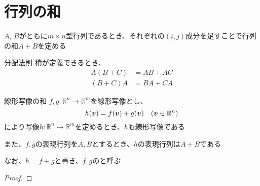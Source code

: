 \documentclass[../../../topic_linear-algebra]{subfiles}
\begin{document}
\sectionline
\section{行列の和}

\begin{mindflow}
\end{mindflow}

$A, \, B$がともに$m \times n$型行列であるとき、それぞれの$(i, j)$成分を足すことで行列の和$A + B$を定める

\begin{theorem*}{分配法則}
  積が定義できるとき、
  \begin{align*}
    A(B + C) & = AB + AC \\
    (B + C)A & = BA + CA
  \end{align*}
\end{theorem*}

\sectionline

\begin{theorem*}{線形写像の和}
  $f,g\colon \mathbb{R}^n \to \mathbb{R}^m$を線形写像とし、
  \begin{equation*}
    h(\vb*{v}) = f(\vb*{v}) + g(\vb*{v}) \quad (\vb*{v} \in \mathbb{R}^n)
  \end{equation*}
  により写像$h\colon \mathbb{R}^n \to \mathbb{R}^m$を定めるとき、$h$も線形写像である

  また、$f,g$の表現行列を$A,B$とするとき、$h$の表現行列は$A + B$である

  なお、$h = f + g$と書き、$f,g$のと呼ぶ
\end{theorem*}

\begin{proof}
\end{proof}
\end{document}

